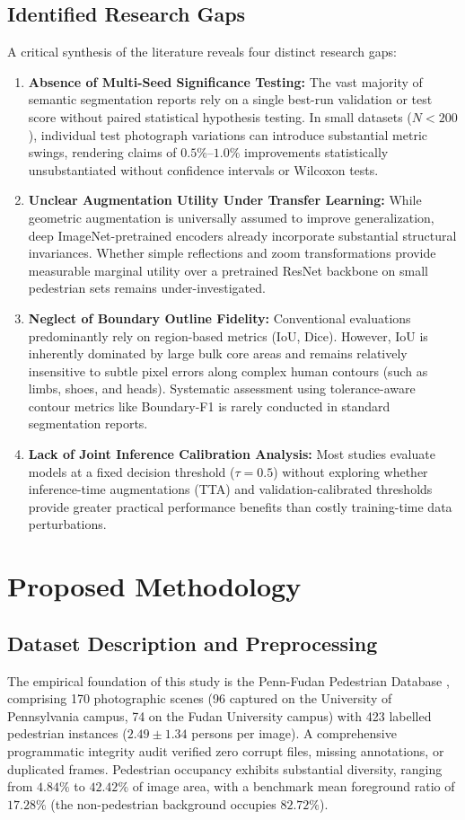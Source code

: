 \documentclass[10pt,a4paper]{article}
\begin{document}
\subsection{Identified Research Gaps}
A critical synthesis of the literature reveals four distinct research gaps:
\begin{enumerate}
    \item \textbf{Absence of Multi-Seed Significance Testing:} The vast majority of semantic segmentation reports rely on a single best-run validation or test score without paired statistical hypothesis testing. In small datasets ($N < 200$), individual test photograph variations can introduce substantial metric swings, rendering claims of $0.5\%$--$1.0\%$ improvements statistically unsubstantiated without confidence intervals or Wilcoxon tests.
    \item \textbf{Unclear Augmentation Utility Under Transfer Learning:} While geometric augmentation is universally assumed to improve generalization, deep ImageNet-pretrained encoders already incorporate substantial structural invariances. Whether simple reflections and zoom transformations provide measurable marginal utility over a pretrained ResNet backbone on small pedestrian sets remains under-investigated.
    \item \textbf{Neglect of Boundary Outline Fidelity:} Conventional evaluations predominantly rely on region-based metrics (IoU, Dice). However, IoU is inherently dominated by large bulk core areas and remains relatively insensitive to subtle pixel errors along complex human contours (such as limbs, shoes, and heads). Systematic assessment using tolerance-aware contour metrics like Boundary-F1 is rarely conducted in standard segmentation reports.
    \item \textbf{Lack of Joint Inference Calibration Analysis:} Most studies evaluate models at a fixed decision threshold ($\tau = 0.5$) without exploring whether inference-time augmentations (TTA) and validation-calibrated thresholds provide greater practical performance benefits than costly training-time data perturbations.
\end{enumerate}

\section{Proposed Methodology}

\subsection{Dataset Description and Preprocessing}
The empirical foundation of this study is the Penn-Fudan Pedestrian Database \cite{wang2007object}, comprising 170 photographic scenes (96 captured on the University of Pennsylvania campus, 74 on the Fudan University campus) with 423 labelled pedestrian instances ($2.49 \pm 1.34$ persons per image). A comprehensive programmatic integrity audit verified zero corrupt files, missing annotations, or duplicated frames. Pedestrian occupancy exhibits substantial diversity, ranging from $4.84\%$ to $42.42\%$ of image area, with a benchmark mean foreground ratio of $17.28\%$ (the non-pedestrian background occupies $82.72\%$).
\end{document}
